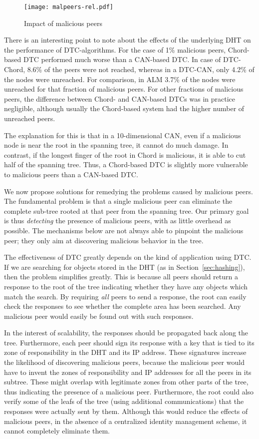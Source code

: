 \documentclass[fleqn,12pt,twoside]{article}
\begin{document}
\begin{figure}[!tb]
  \centering
  \texttt{[image: malpeers-rel.pdf]}
  \caption{Impact of malicious peers}
  \label{fig:malpeers}
\end{figure}

There is an interesting point to note about the effects of the
underlying DHT on the performance of DTC-algorithms. For the case of
1\% malicious peers, Chord-based DTC performed much worse than a
CAN-based DTC. In case of DTC-Chord, 8.6\% of the peers were not
reached, whereas in a DTC-CAN, only 4.2\% of the nodes were unreached.
For comparison, in ALM 3.7\% of the nodes were unreached for that
fraction of malicious peers. For other fractions of malicious peers,
the difference between Chord- and CAN-based DTCs was in practice
negligible, although usually the Chord-based system had the higher
number of unreached peers.


The explanation for this is that in a 10-dimensional CAN, even if a
malicious node is near the root in the spanning tree, it cannot do
much damage. In contrast, if the longest finger of the root in Chord
is malicious, it is able to cut half of the spanning tree. Thus, a
Chord-based DTC is slightly more vulnerable to malicious peers than a
CAN-based DTC.

We now propose solutions for remedying the problems caused by
malicious peers. The fundamental problem is that a single malicious
peer can eliminate the complete sub-tree rooted at that peer from the
spanning tree.  Our primary goal is thus \emph{detecting} the presence
of malicious peers, with as little overhead as possible. The
mechanisms below are not always able to pinpoint the malicious peer;
they only aim at discovering malicious behavior in the tree.

The effectiveness of DTC greatly depends on the kind of
application using DTC. If we are searching for objects stored in
the DHT (as in Section~\ref{sec:hashing}), then the problem
simplifies greatly. This is because all peers should return a response
to the root of the tree indicating whether they have any objects which
match the search. By requiring \emph{all} peers to send a response,
the root can easily check the responses to see whether the complete
area has been searched. Any malicious peer would easily be found out
with such responses.

In the interest of scalability, the responses should be propagated
back along the tree. Furthermore, each peer should sign its response
with a key that is tied to its zone of responsibility in the DHT and
its IP address. These signatures increase the likelihood of
discovering malicious peers, because the malicious peer would have to
invent the zones of responsibility and IP addresses for all the peers
in its subtree. These might overlap with legitimate zones from other
parts of the tree, thus indicating the presence of a malicious peer.
Furthermore, the root could also verify some of the leafs of the tree
(using additional communications) that the responses were actually
sent by them. Although this would reduce the effects of malicious
peers, in the absence of a centralized identity management scheme, it
cannot completely eliminate them.
\end{document}
